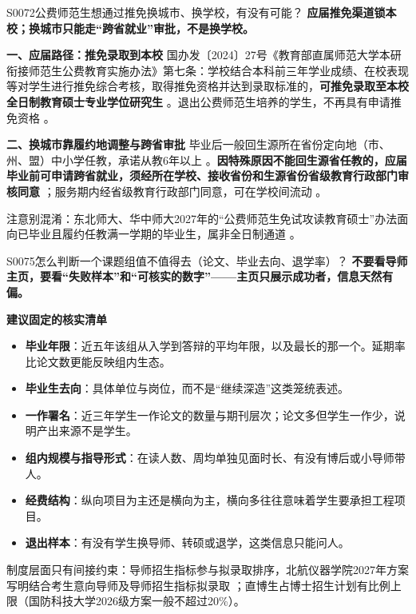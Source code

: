 \begin{qa}{S0072}{公费师范生想通过推免换城市、换学校，有没有可能？}
\textbf{应届推免渠道锁本校；换城市只能走“跨省就业”审批，不是换学校。}

\textbf{一、应届路径：推免录取到本校}
国办发〔2024〕27号《教育部直属师范大学本研衔接师范生公费教育实施办法》第七条：学校结合本科前三年学业成绩、在校表现等对学生进行推免综合考核，取得推免资格并达到录取标准的，\textbf{可推免录取至本校全日制教育硕士专业学位研究生} 。退出公费师范生培养的学生，不再具有申请推免资格 。

\textbf{二、换城市靠履约地调整与跨省审批}
毕业后一般回生源所在省份定向地（市、州、盟）中小学任教，承诺从教6年以上 。\textbf{因特殊原因不能回生源省任教的，应届毕业前可申请跨省就业，须经所在学校、接收省份和生源省份省级教育行政部门审核同意} ；服务期内经省级教育行政部门同意，可在学校间流动 。

注意别混淆：东北师大、华中师大2027年的“公费师范生免试攻读教育硕士”办法面向已毕业且履约任教满一学期的毕业生，属非全日制通道 。
\end{qa}

\begin{qa}{S0075}{怎么判断一个课题组值不值得去（论文、毕业去向、退学率）？}
\textbf{不要看导师主页，要看“失败样本”和“可核实的数字”——主页只展示成功者，信息天然有偏。}

\textbf{建议固定的核实清单}
\begin{itemize}
  \item \textbf{毕业年限}：近五年该组从入学到答辩的平均年限，以及最长的那一个。延期率比论文数更能反映组内生态。
  \item \textbf{毕业生去向}：具体单位与岗位，而不是“继续深造”这类笼统表述。
  \item \textbf{一作署名}：近三年学生一作论文的数量与期刊层次；论文多但学生一作少，说明产出来源不是学生。
  \item \textbf{组内规模与指导形式}：在读人数、周均单独见面时长、有没有博后或小导师带人。
  \item \textbf{经费结构}：纵向项目为主还是横向为主，横向多往往意味着学生要承担工程项目。
  \item \textbf{退出样本}：有没有学生换导师、转硕或退学，这类信息只能问人。
\end{itemize}

制度层面只有间接约束：导师招生指标参与拟录取排序，北航仪器学院2027年方案写明结合考生意向导师及导师招生指标拟录取 ；直博生占博士招生计划有比例上限（国防科技大学2026级方案一般不超过20\%）。
\end{qa}

